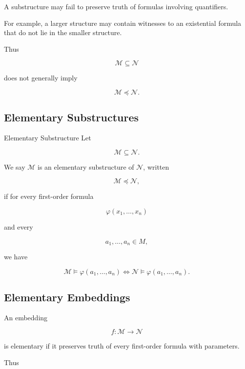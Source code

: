 A substructure may fail to preserve truth of formulas involving
quantifiers.

For example, a larger structure may contain witnesses to an existential
formula that do not lie in the smaller structure.

Thus

\[
\boxed{
\mathcal{M}\subseteq\mathcal{N}
}
\]

does not generally imply

\[
\boxed{
\mathcal{M}\preccurlyeq\mathcal{N}.
}
\]

\subsection{Elementary Substructures}
\label{subsec:elementary-substructures}

\begin{definitionbox}{Elementary Substructure}
Let

\[
\mathcal{M}
\subseteq
\mathcal{N}.
\]

We say \(\mathcal{M}\) is an elementary substructure of \(\mathcal{N}\),
written

\[
\boxed{
\mathcal{M}
\preccurlyeq
\mathcal{N},
}
\]

if for every first-order formula

\[
\varphi(x_1,\ldots,x_n)
\]

and every

\[
a_1,\ldots,a_n\in M,
\]

we have

\[
\boxed{
\mathcal{M}
\models
\varphi(a_1,\ldots,a_n)
\iff
\mathcal{N}
\models
\varphi(a_1,\ldots,a_n).
}
\]
\end{definitionbox}

\subsection{Elementary Embeddings}
\label{subsec:elementary-embeddings}

An embedding

\[
f:\mathcal{M}\to\mathcal{N}
\]

is elementary if it preserves truth of every first-order formula with
parameters.

Thus

